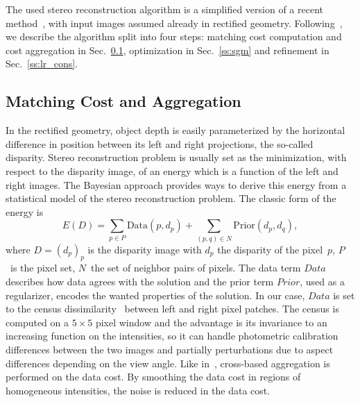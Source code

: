 \documentclass{article}
\begin{document}
The used stereo reconstruction algorithm is a simplified version of a recent method~\cite{zbontar16}, with input images assumed already in rectified geometry. Following~\cite{scharstein02}, we describe the algorithm split into four steps: matching cost computation and cost aggregation in Sec.~\ref{ss:cost}, optimization in Sec.~\ref{ss:sgm} and refinement in Sec.~\ref{ss:lr_cons}.

\subsection{Matching Cost and Aggregation}

\label{ss:cost}

In the rectified geometry, object depth is easily parameterized by the horizontal difference in position between its left and right projections, the so-called disparity. Stereo reconstruction problem is usually set as the minimization, with respect to the disparity image, of an energy which is a function of the left and right images. The Bayesian approach provides ways to derive this energy from a statistical model of the stereo reconstruction problem. The classic form of the energy is
\begin{equation}
E(D) = \sum_{p \in P}{\text{Data}(p,d_p)} + \sum_{(p,q) \in N}{\text{Prior}(d_p,d_q)},
\label{eq:global_en}
\end{equation}
where $D=(d_p)_p$ is the disparity image with $d_p$ the disparity of the pixel~$p$, $P$~is the pixel set, $N$~the set of neighbor pairs of pixels. The data term $Data$ describes how data agrees with the solution and the prior term $Prior$, used as a regularizer, encodes the wanted properties of the solution. In our case, $Data$ is set to the census dissimilarity~\cite{zabih94} between left and right pixel patches. The census is computed on a $5\times5$ pixel window and the advantage is its invariance to an increasing function on the intensities, so it can handle photometric calibration differences between the two images and partially perturbations due to aspect differences depending on the view angle. Like in~\cite{zhang09}, cross-based aggregation is performed on the data cost. By smoothing the data cost in regions of homogeneous intensities, the noise is reduced in the data cost.
\end{document}
